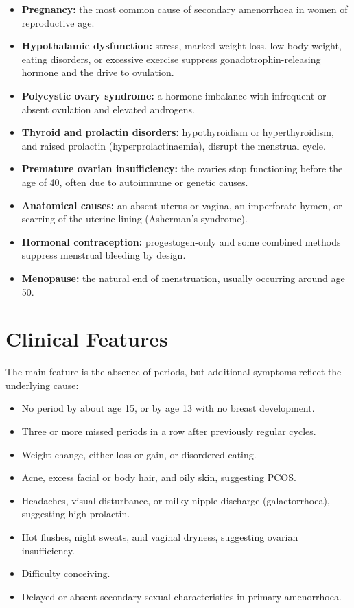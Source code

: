 \begin{itemize}
    \item \textbf{Pregnancy:} the most common cause of secondary amenorrhoea in women of reproductive age.
    \item \textbf{Hypothalamic dysfunction:} stress, marked weight loss, low body weight, eating disorders, or excessive exercise suppress gonadotrophin-releasing hormone and the drive to ovulation.
    \item \textbf{Polycystic ovary syndrome:} a hormone imbalance with infrequent or absent ovulation and elevated androgens.
    \item \textbf{Thyroid and prolactin disorders:} hypothyroidism or hyperthyroidism, and raised prolactin (hyperprolactinaemia), disrupt the menstrual cycle.
    \item \textbf{Premature ovarian insufficiency:} the ovaries stop functioning before the age of 40, often due to autoimmune or genetic causes.
    \item \textbf{Anatomical causes:} an absent uterus or vagina, an imperforate hymen, or scarring of the uterine lining (Asherman's syndrome).
    \item \textbf{Hormonal contraception:} progestogen-only and some combined methods suppress menstrual bleeding by design.
    \item \textbf{Menopause:} the natural end of menstruation, usually occurring around age 50.
\end{itemize}

\section*{Clinical Features}
The main feature is the absence of periods, but additional symptoms reflect the underlying cause:

\begin{itemize}
    \item No period by about age 15, or by age 13 with no breast development.
    \item Three or more missed periods in a row after previously regular cycles.
    \item Weight change, either loss or gain, or disordered eating.
    \item Acne, excess facial or body hair, and oily skin, suggesting PCOS.
    \item Headaches, visual disturbance, or milky nipple discharge (galactorrhoea), suggesting high prolactin.
    \item Hot flushes, night sweats, and vaginal dryness, suggesting ovarian insufficiency.
    \item Difficulty conceiving.
    \item Delayed or absent secondary sexual characteristics in primary amenorrhoea.
\end{itemize}

